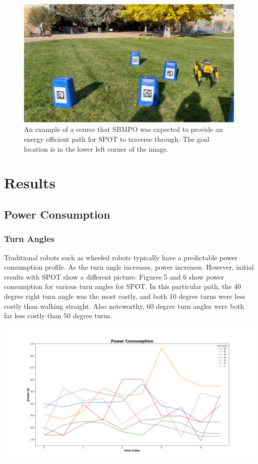 \documentclass[conference]{IEEEtran}
\begin{document}
    \begin{figure}[ht]
    \centering
    \includegraphics[width=\linewidth]{obstacles.png}
    \caption{An example of a course that SBMPO was expected to provide an energy efficient path for SPOT to traverse through. The goal location is in the lower left corner of the image.}
    \label{fig:spotWithObstacles}
    \end{figure}
     
\section{Results}
    \subsection{Power Consumption}
    \subsubsection{Turn Angles}
    Traditional robots such as wheeled robots typically have a predictable power consumption profile. As the turn angle increases, power increases. However, initial results with SPOT show a different picture. Figures 5 and 6 show power consumption for various turn angles for SPOT. In this particular path, the 40 degree right turn angle was the most costly, and both 10 degree turns were less costly than walking straight. Also noteworthy, 60 degree turn angles were both far less costly than 50 degree turns.  
    
    \begin{adjustbox}{center, caption={Power Consumption for various turn angles},nofloat=figure}
        \includegraphics[width=1\linewidth]{power_turnRadius.png}
    \end{adjustbox}
    
\end{document}
